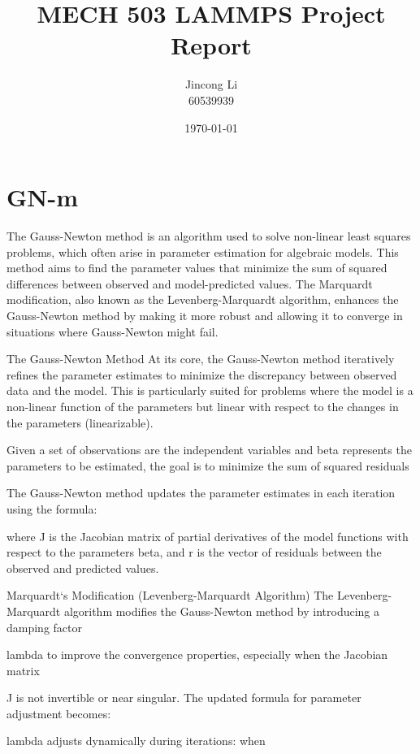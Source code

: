 \documentclass[17pt]{extarticle} %
\begin{document}
\setlength{\parskip}{1em} 
\setlength{\parindent}{0pt}
\newcommand{\vect}[1]{\mathbf{#1}}

\title{MECH 503 LAMMPS Project Report}
\author{Jincong Li \\ 60539939}
\date{\today}
\maketitle

\section*{GN-m}
The Gauss-Newton method is an algorithm used to solve non-linear least squares problems, which often arise in parameter estimation for algebraic models. This method aims to find the parameter values that minimize the sum of squared differences between observed and model-predicted values. The Marquardt modification, also known as the Levenberg-Marquardt algorithm, enhances the Gauss-Newton method by making it more robust and allowing it to converge in situations where Gauss-Newton might fail.

The Gauss-Newton Method
At its core, the Gauss-Newton method iteratively refines the parameter estimates to minimize the discrepancy between observed data and the model. This is particularly suited for problems where the model is a non-linear function of the parameters but linear with respect to the changes in the parameters (linearizable).

Given a set of observations are the independent variables and 
beta represents the parameters to be estimated, the goal is to minimize the sum of squared residuals 


The Gauss-Newton method updates the parameter estimates in each iteration using the formula:

where J is the Jacobian matrix of partial derivatives of the model functions with respect to the parameters 
beta, and r is the vector of residuals between the observed and predicted values.

Marquardt`s Modification (Levenberg-Marquardt Algorithm)
The Levenberg-Marquardt algorithm modifies the Gauss-Newton method by introducing a damping factor 

lambda to improve the convergence properties, especially when the Jacobian matrix 

J is not invertible or near singular. The updated formula for parameter adjustment becomes:

lambda adjusts dynamically during iterations: when 
\end{document}
